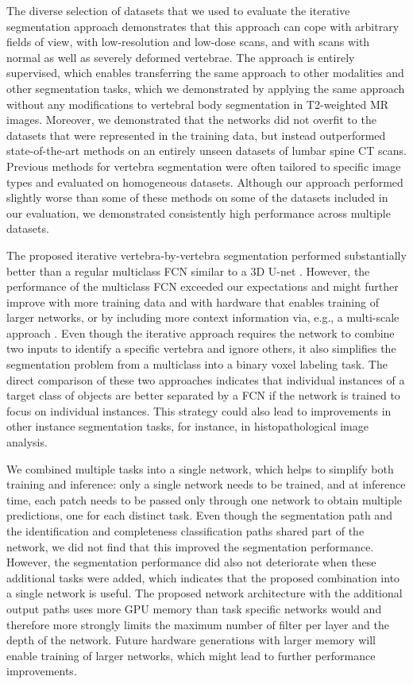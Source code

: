 \documentclass[authoryear,5p,final,times]{elsarticle}
\begin{document}
    The diverse selection of datasets that we used to evaluate the iterative segmentation approach demonstrates that this approach can cope with arbitrary fields of view, with low-resolution and low-dose scans, and with scans with normal as well as severely deformed vertebrae. The approach is entirely supervised, which enables transferring the same approach to other modalities and other segmentation tasks, which we demonstrated by applying the same approach without any modifications to vertebral body segmentation in T2-weighted MR images. Moreover, we demonstrated that the networks did not overfit to the datasets that were represented in the training data, but instead outperformed state-of-the-art methods on an entirely unseen datasets of lumbar spine CT scans.
    Previous methods for vertebra segmentation were often tailored to specific image types and evaluated on homogeneous datasets. Although our approach performed slightly worse than some of these methods on some of the datasets included in our evaluation, we demonstrated consistently high performance across multiple datasets.
    
    The proposed iterative vertebra-by-vertebra segmentation performed substantially better than a regular multiclass FCN similar to a 3D U-net \citep{Cicek2016}. However, the performance of the multiclass FCN exceeded our expectations and might further improve with more training data and with hardware that enables training of larger networks, or by including more context information via, e.g., a multi-scale approach \citep{Moeskops2016,Kamnitsas2017}. Even though the iterative approach requires the network to combine two inputs to identify a specific vertebra and ignore others, it also simplifies the segmentation problem from a multiclass into a binary voxel labeling task. The direct comparison of these two approaches indicates that individual instances of a target class of objects are better separated by a FCN if the network is trained to focus on individual instances. This strategy could also lead to improvements in other instance segmentation tasks, for instance, in histopathological image analysis.
    
    We combined multiple tasks into a single network, which helps to simplify both training and inference: only a single network needs to be trained, and at inference time, each patch needs to be passed only through one network to obtain multiple predictions, one for each distinct task. Even though the segmentation path and the identification and completeness classification paths shared part of the network, we did not find that this improved the segmentation performance. However, the segmentation performance did also not deteriorate when these additional tasks were added, which indicates that the proposed combination into a single network is useful. The proposed network architecture with the additional output paths uses more GPU memory than task specific networks would and therefore more strongly limits the maximum number of filter per layer and the depth of the network. Future hardware generations with larger memory will enable training of larger networks, which might lead to further performance improvements.
    
\end{document}
